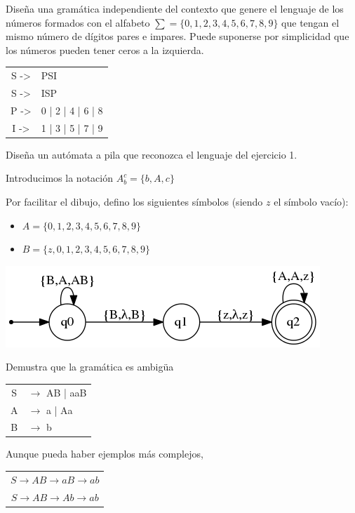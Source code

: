 \documentclass[nochap]{apuntes}
\begin{document}
\begin{problem}[2]
Diseña una gramática independiente del contexto que genere el lenguaje de los números formados con el alfabeto $\sum = \{0, 1, 2, 3, 4, 5, 6, 7, 8, 9\} $ que tengan el mismo número de dígitos pares e impares. Puede suponerse por simplicidad que los números pueden tener ceros a la izquierda.

\solution

\begin{tabular}{cl}
S ->& PSI\\
S ->& ISP\\
P ->& 0 | 2 | 4 | 6 | 8\\
I ->& 1 | 3 | 5 | 7 | 9
\end{tabular}

\end{problem}

\begin{problem}[3]
Diseña un autómata a pila que reconozca el lenguaje del ejercicio 1.
\solution

Introducimos la notación $A_b^c = \{b,A,c\}$

Por facilitar el dibujo, defino los siguientes símbolos (siendo $z$ el símbolo vacío): 
\begin{itemize}
\item $A=\{0,1,2,3,4,5,6,7,8,9\}$
\item $B=\{z,0,1,2,3,4,5,6,7,8,9\}$
\end{itemize}

\includegraphics[scale=0.75]{data/png/2_3.png}

\end{problem}

\begin{problem}[4]
Demustra que la gramática es ambigüa
\begin{tabular}{cl}
S &$\to$ AB | aaB\\
A &$\to$ a | Aa\\
B &$\to$ b
\end{tabular}

\solution

Aunque pueda haber ejemplos más complejos, 

\begin{tabular}{c}	
$S\to AB\to aB \to ab$\\
$S\to AB\to Ab \to ab$
\end{tabular}

\end{problem}
\end{document}
